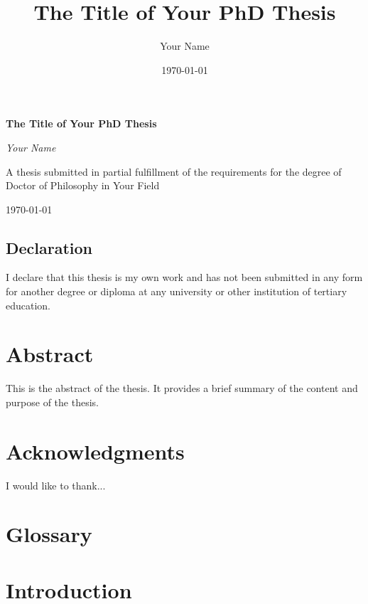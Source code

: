 \documentclass[12pt, oneside]{book}
\title{The Title of Your PhD Thesis}
\author{Your Name}
\date{\today}
\begin{document}
\begin{titlepage}
    \centering
    \vspace*{1in}
    {\Huge\bfseries The Title of Your PhD Thesis\par}
    \vspace{1.5in}
    {\Large\itshape Your Name\par}
    \vfill
    A thesis submitted in partial fulfillment of the requirements for the degree of Doctor of Philosophy in Your Field\par
    \vfill
    {\Large \today\par}
\end{titlepage}

\clearpage
\thispagestyle{empty}
\section*{Declaration}
I declare that this thesis is my own work and has not been submitted in any form for another degree or diploma at any university or other institution of tertiary education.

\clearpage
\chapter*{Abstract}
This is the abstract of the thesis. It provides a brief summary of the content and purpose of the thesis.

\clearpage
\chapter*{Acknowledgments}
I would like to thank...

\clearpage
\tableofcontents

\clearpage
\listoffigures

\clearpage
\listoftables

\clearpage
\chapter*{Glossary}
\printglossary

\clearpage
\chapter{Introduction}
\end{document}
